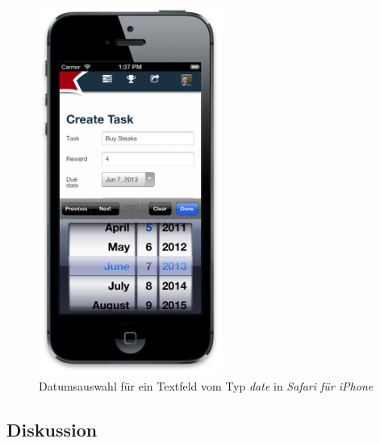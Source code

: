 \begin{figure}[H]
	\centering
	\includegraphics[width=6cm]{content/principle-demonstration/images/iossafari-datepicker.png}
	\caption{Datumsauswahl für ein Textfeld vom Typ \emph{date} in \emph{Safari für iPhone}}
	\label{fig:iossafari-datepicker}
\end{figure}




\subsection*{Diskussion}


